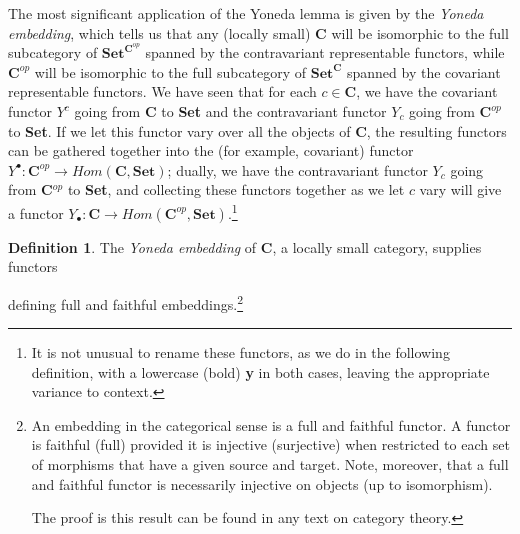 \documentclass[11pt]{book}
\theoremstyle{definition}
\theoremstyle{definition}
\newtheorem{definition}{Definition}[section]
\theoremstyle{definition}
\theoremstyle{theorem}
\theoremstyle{definition}
\begin{document}
\begin{center}  
\end{center} 
The most significant application of the Yoneda lemma is given by the \textit{Yoneda embedding}, which tells us that any (locally small) \textbf{C} will be isomorphic to the full subcategory of $\textbf{Set}^{\textbf{C}^{op}}$ spanned by the contravariant representable functors, while $\textbf{C}^{op}$ will be isomorphic to the full subcategory of $\textbf{Set}^{\textbf{C}}$ spanned by the covariant representable functors. We have seen that for each $c \in \textbf{C}$, we have the covariant functor $Y^c$ going from \textbf{C} to \textbf{Set} and the contravariant functor $Y_c$ going from $\textbf{C}^{op}$ to \textbf{Set}. If we let this functor vary over all the objects of \textbf{C}, the resulting functors can be gathered together into the (for example, covariant) functor $Y^{\bullet}: \textbf{C}^{op} \rightarrow Hom(\textbf{C}, \textbf{Set})$; dually, we have the contravariant functor $Y_c$ going from \textbf{C}$^{op}$ to \textbf{Set}, and collecting these functors together as we let $c$ vary will give a functor $Y_{\bullet}: \textbf{C} \rightarrow Hom(\textbf{C}^{op}, \textbf{Set})$.\footnote{It is not unusual to rename these functors, as we do in the following definition, with a lowercase (bold) \textbf{y} in both cases, leaving the appropriate variance to context.}
\begin{definition} The \textit{Yoneda embedding}  of \textbf{C}, a locally small category, supplies functors 
	\begin{center} 
	\end{center} 
	defining full and faithful embeddings.\footnote{An embedding in the categorical sense is a full and faithful functor. A functor is faithful (full) provided it is injective (surjective) when restricted to each set of morphisms that have a given source and target. Note, moreover, that a full and faithful functor is necessarily injective on objects (up to isomorphism). \par 
	The proof is this result can be found in any text on category theory.} 
\end{definition}
\end{document}
